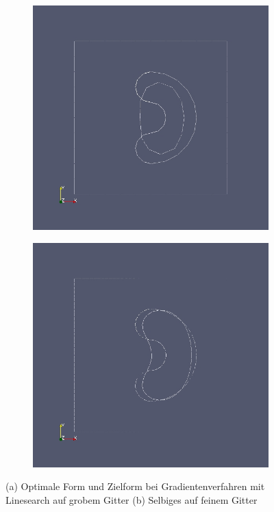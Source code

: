 \begin{figure}
	\begin{subfigure}{0.5\textwidth}
	\centering
	\includegraphics[scale=0.25]{pic_brokendonut_gradient_linesearch.jpg}
	\caption{}	
	\end{subfigure}
	\begin{subfigure}{0.5\textwidth}
	\centering
	\includegraphics[scale=0.25]{pic_brokendonut_gradient_linesearch_fine.jpg}
	\caption{}	
	\end{subfigure}
\caption{(a) Optimale Form und Zielform bei Gradientenverfahren mit Linesearch auf grobem Gitter (b) Selbiges auf feinem Gitter}
\label{brokendonutgradient_linesearch}
\end{figure}

